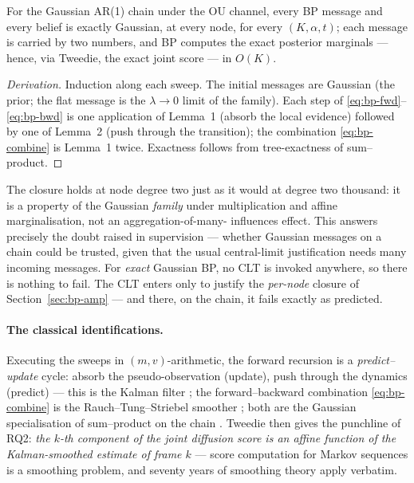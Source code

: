 \begin{theorem}\label{thm:bp-closure}
For the Gaussian AR(1) chain under the OU channel, every BP message and
every belief is exactly Gaussian, at every node, for every
$(K, \alpha, t)$; each message is carried by two numbers, and BP computes
the exact posterior marginals --- hence, via Tweedie, the exact joint
score --- in $O(K)$.
\end{theorem}

\begin{proof}[Derivation]
Induction along each sweep. The initial messages are Gaussian (the prior;
the flat message is the $\lambda \to 0$ limit of the family). Each step of
\eqref{eq:bp-fwd}--\eqref{eq:bp-bwd} is one application of Lemma~1 (absorb
the local evidence) followed by one of Lemma~2 (push through the
transition); the combination \eqref{eq:bp-combine} is Lemma~1 twice.
Exactness follows from tree-exactness of sum--product.
\end{proof}

\begin{remark}
\label{rmk:bp-no-clt}
The closure holds at node degree two just as it would at degree two
thousand: it is a property of the Gaussian \emph{family} under
multiplication and affine marginalisation, not an aggregation-of-many-
influences effect. This answers precisely the doubt raised in supervision
--- whether Gaussian messages on a chain could be trusted, given that the
usual central-limit justification needs many incoming messages. For
\emph{exact} Gaussian BP, no CLT is invoked anywhere, so there is nothing
to fail. The CLT enters only to justify the \emph{per-node} closure of
Section~\ref{sec:bp-amp} --- and there, on the chain, it fails exactly as
predicted.
\end{remark}

\paragraph{The classical identifications.} Executing the sweeps in
$(m, v)$-arithmetic, the forward recursion is a \emph{predict--update}
cycle: absorb the pseudo-observation (update), push through the dynamics
(predict) --- this is the Kalman filter \citep{kalman1960new}; the
forward--backward combination \eqref{eq:bp-combine} is the
Rauch--Tung--Striebel smoother \citep{rauch1965maximum}; both are the
Gaussian specialisation of sum--product on the chain
\citep{kschischang2001factor, bishop2006pattern}. Tweedie then gives the
punchline of RQ2: \emph{the $k$-th component of the joint diffusion score
is an affine function of the Kalman-smoothed estimate of frame $k$} ---
score computation for Markov sequences is a smoothing problem, and
seventy years of smoothing theory apply verbatim.

